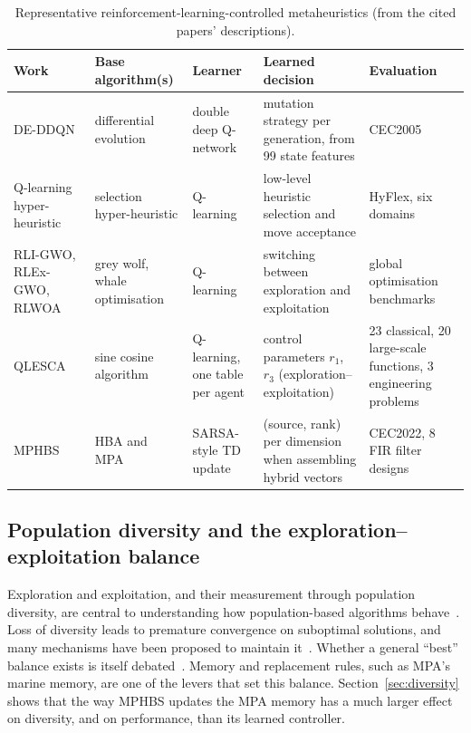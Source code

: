 \documentclass[11pt]{article}
\theoremstyle{definition}
\theoremstyle{remark}
\begin{document}
\begin{table}[!t]
\centering
\caption{Representative reinforcement-learning-controlled metaheuristics (from the cited papers' descriptions).}
\label{tab:rl-survey}
\footnotesize
\setlength{\tabcolsep}{3pt}
\begin{tabular}{p{3.0cm}p{2.4cm}p{2.0cm}p{4.3cm}p{3.2cm}}
\toprule
Work & Base algorithm(s) & Learner & Learned decision & Evaluation \\
\midrule
DE-DDQN~\citep{sharma2019deddqn} & differential evolution & double deep Q-network & mutation strategy per generation, from 99 state features & CEC2005 \\
Q-learning hyper-heuristic~\citep{choong2018hh} & selection hyper-heuristic & Q-learning & low-level heuristic selection and move acceptance & HyFlex, six domains \\
RLI-GWO, RLEx-GWO, RLWOA~\citep{seyyedabbasi2021rl} & grey wolf, whale optimisation & Q-learning & switching between exploration and exploitation & global optimisation benchmarks \\
QLESCA~\citep{hamad2022qlesca} & sine cosine algorithm & Q-learning, one table per agent & control parameters $r_1$, $r_3$ (exploration--exploitation) & 23 classical, 20 large-scale functions, 3 engineering problems \\
MPHBS~\citep{flores2026mphbs} & HBA and MPA & SARSA-style TD update & (source, rank) per dimension when assembling hybrid vectors & CEC2022, 8 FIR filter designs \\
\bottomrule
\end{tabular}
\end{table}

\subsection{Population diversity and the exploration--exploitation balance}
Exploration and exploitation, and their measurement through population diversity, are central to understanding how
population-based algorithms behave~\citep{crepinsek2013exploration}. Loss of diversity leads to premature convergence on
suboptimal solutions, and many mechanisms have been proposed to maintain it~\citep{squillero2016diversity}. Whether a
general ``best'' balance exists is itself debated~\citep{morales2020balance}. Memory and replacement rules, such as MPA's
marine memory, are one of the levers that set this balance. Section~\ref{sec:diversity} shows that the way MPHBS updates
the MPA memory has a much larger effect on diversity, and on performance, than its learned controller.
\end{document}
